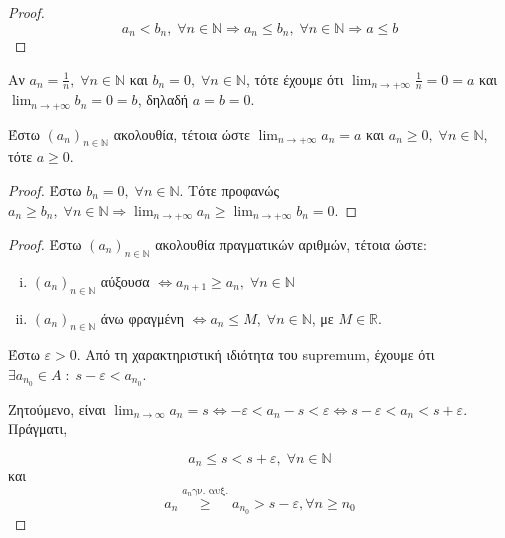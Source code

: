 \documentclass[main.tex]{subfiles}
\begin{document}

\begin{proof}
\item {}
    \[ a_{n}< b_{n}, \; \forall n \in \mathbb{N} \Rightarrow a_{n} \leq 
    b_{n}, \; \forall n \in \mathbb{N} \Rightarrow a \leq b \]
\end{proof}

\begin{rem}
\item {}
    Αν $ a_{n}= \frac{1}{n}, \; \forall n \in \mathbb{N} $ 
    και $ b_{n}=0, \; \forall n \in \mathbb{N} $, τότε έχουμε ότι 
    $ \lim_{n \to +\infty} \frac{1}{n} = 0 = a $ και $ \lim_{n \to
    +\infty} b_{n} = 0 = b $, δηλαδή $ a=b=0  $.
\end{rem}

\begin{cor}
    Έστω $ (a_{n})_{n \in \mathbb{N}} $ ακολουθία, τέτοια ώστε 
    $ \lim_{n \to +\infty} a_{n} = a$ και $ a_{n} \geq 0, \; \forall 
    n \in \mathbb{N} $, τότε $ a \geq 0 $.
\end{cor}

\begin{proof}
    Έστω $ b_{n} = 0, \; \forall n \in \mathbb{N} $. Τότε προφανώς 
    $ a_{n} \geq b_{n}, \; \forall n
    \in \mathbb{N} \Rightarrow \lim_{n \to +\infty} a_{n} \geq 
    \lim_{n \to +\infty} b_{n} = 0$.
\end{proof}


\begin{proof}
    Έστω $ (a_{n})_{n \in \mathbb{N}} $ ακολουθία πραγματικών αριθμών, 
    τέτοια ώστε:
    \begin{enumerate}[i)]
        \item $ (a_{n})_{n \in \mathbb{N}} $ αύξουσα $ \Leftrightarrow 
            a_{n+1} \geq a_{n}, \; \forall n \in \mathbb{N}$ 
        \item $ (a_{n})_{n \in \mathbb{N}} $ άνω  φραγμένη $ 
            \Leftrightarrow a_{n} \leq M, \; \forall n \in 
            \mathbb{N}$, με $ M \in \mathbb{R} $.
    \end{enumerate}

    Έστω $ \varepsilon >0 $. Από τη χαρακτηριστική ιδιότητα του 
    supremum, έχουμε ότι $ \exists a_{n_{0}} \in A \; : \; s - \varepsilon 
    < a_{n_{0}} $.

    Ζητούμενο, είναι $ \lim_{n \to \infty} a_{n} = s \Leftrightarrow 
    - \varepsilon < a_{n} -s < \varepsilon \Leftrightarrow s - 
    \varepsilon < a_{n} < s + \varepsilon $. Πράγματι, 

    \[ a_{n} \leq s < s + \varepsilon, \; \forall n \in \mathbb{N} \] και 
    \[ a_{n} \overset{a_{n} \text{γν. αυξ.}}{\geq} a_{n_{0}} > s - 
    \varepsilon, \forall n \geq n_{0} \]
\end{proof}
\end{document}
